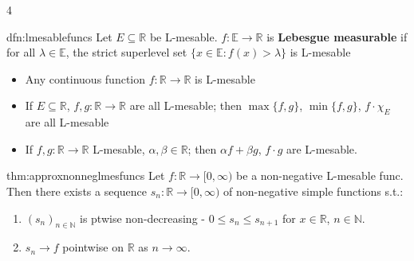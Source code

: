 \documentclass[landscape, 8pt]{extarticle}
\begin{document}
\begin{multicols*}{4}
		
		\begin{mdfn}{dfn:lmesablefuncs}{ }
			Let $E \subseteq \mathbb{R}$ be L-mesable. $f: \mathbb{E} \to \mathbb{R}$ is \textbf{Lebesgue measurable} if for all $\lambda\in \mathbb{E}$, the strict superlevel set $\{x\in \mathbb{E} : f(x) > \lambda\}$ is L-mesable
			\begin{itemize}
				\item Any continuous function $f: \mathbb{R} \to \mathbb{R}$ is L-mesable
				\item If $E \subseteq \mathbb{R}$, $f, g : \mathbb{R} \to \mathbb{R}$ are all L-mesable; then $\max\{f, g\}$, $\min\{f, g\}$, $f\cdot\chi_E$ are all L-mesable
				\item If $f, g : \mathbb{R} \to \mathbb{R}$ L-mesable, $\alpha, \beta\in \mathbb{R}$; then $\alpha f + \beta g$, $f \cdot g$ are L-mesable.
			\end{itemize}
			
		\end{mdfn}
		
		
		\begin{thm}{thm:approxnonneglmesfuncs}{ }
			Let $f: \mathbb{R} \to [0, \infty)$ be a non-negative L-mesable func. Then there exists a sequence $s_n : \mathbb{R} \to [0, \infty)$ of non-negative simple functions s.t.:
			\begin{enumerate}[label=(\arabic*)]
				\item $(s_n)_{n\in \mathbb{N}}$ is ptwise non-decreasing - $0 \le s_n \le s_{n+1}$ for $x\in \mathbb{R}$, $n\in \mathbb{N}$.
				\item $s_n \to f$ pointwise on $\mathbb{R}$ as $n \to \infty$.
			\end{enumerate}
			
		\end{thm}
		

\end{multicols*}
\end{document}
